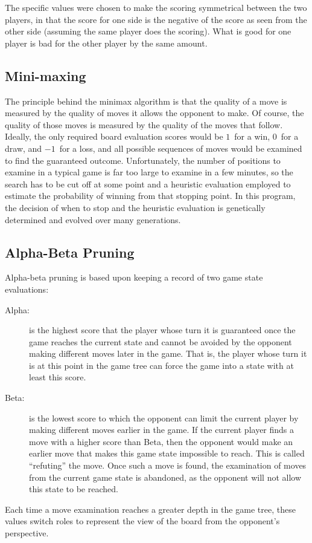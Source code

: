 \documentclass[letterpaper]{article}
\renewcommand{\_}{\allowbreak\textunderscore\allowbreak}
\begin{document}
The specific values were chosen to make the scoring symmetrical between the two players, in that the score for one side is the negative of the score as seen from the other side (assuming the same player does the scoring). What is good for one player is bad for the other player by the same amount.

\subsection{Mini-maxing}

The principle behind the minimax algorithm is that the quality of a move is measured by the quality of moves it allows the opponent to make. Of course, the quality of those moves is measured by the quality of the moves that follow. Ideally, the only required board evaluation scores would be \(1\)~for a win, \(0\)~for a draw, and \(-1\)~for a loss, and all possible sequences of moves would be examined to find the guaranteed outcome. Unfortunately, the number of positions to examine in a typical game is far too large to examine in a few minutes, so the search has to be cut off at some point and a heuristic evaluation employed to estimate the probability of winning from that stopping point. In this program, the decision of when to stop and the heuristic evaluation is genetically determined and evolved over many generations.

\subsection{Alpha-Beta Pruning}

Alpha-beta pruning is based upon keeping a record of two game state evaluations:
\begin{description}
	\item[Alpha:] is the highest score that the player whose turn it is guaranteed once the game reaches the current state and cannot be avoided by the opponent making different moves later in the game. That is, the player whose turn it is at this point in the game tree can force the game into a state with at least this score.
	\item[Beta:] is the lowest score to which the opponent can limit the current player by making different moves earlier in the game. If the current player finds a move with a higher score than Beta, then the opponent would make an earlier move that makes this game state impossible to reach. This is called ``refuting'' the move. Once such a move is found, the examination of moves from the current game state is abandoned, as the opponent will not allow this state to be reached.
\end{description}
Each time a move examination reaches a greater depth in the game tree, these values switch roles to represent the view of the board from the opponent's perspective.
\end{document}
